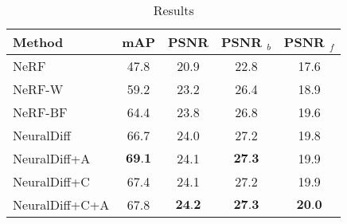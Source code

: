 \begin{table}
    
\centering
\begin{tabular}{lcccc}
    \hline Method & mAP & PSNR & PSNR $_b$ & PSNR $_f$ \\
    \hline NeRF ~\cite{nerf} & 47.8 & 20.9 & 22.8 & 17.6 \\
    NeRF-W ~\cite{nerfw} & 59.2 & 23.2 & 26.4 & 18.9 \\
    NeRF-BF & 64.4 & 23.8 & 26.8 & 19.6 \\
    NeuralDiff  & 66.7 & 24.0 & 27.2 & 19.8 \\
    NeuralDiff+A  & $\mathbf{6 9 . 1}$ & 24.1 & $\mathbf{2 7 . 3}$ & 19.9 \\
    NeuralDiff+C  & 67.4 & 24.1 & 27.2 & 19.9 \\
    NeuralDiff+C+A  & 67.8 & $\mathbf{2 4 . 2}$ & $\mathbf{2 7 . 3}$ & $\mathbf{2 0 . 0}$ \\
    \hline
\end{tabular}
\caption{Results} \label{tab:ndiff_res}
\end{table}